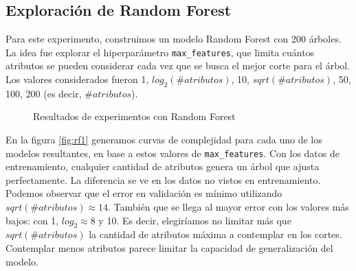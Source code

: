 \subsection*{Exploración de Random Forest}
Para este experimento, construimos un modelo Random Forest con 200 árboles. La idea fue explorar el hiperparámetro \texttt{max\_features}, que limita cuántos atributos se pueden considerar cada vez que se busca el mejor corte para el árbol. Los valores considerados fueron  1, $log_2(\#atributos)$, 10, $sqrt(\#atributos)$, 50, 100, 200 (es decir, $\#atributos$).
 \begin{figure}[H]
    \centering

    \caption{Resultados de experimentos con Random Forest}
    \label{fig:distr}
\end{figure}

En la figura \ref{fig:rf1} generamos curvas de complejidad para cada uno de los modelos resultantes, en base a estos valores de \texttt{max\_features}. Con los datos de entrenamiento, cualquier cantidad de atributos genera un árbol que ajusta perfectamente. La diferencia se ve en los datos no vistos en entrenamiento. Podemos observar que el error en validación es mínimo utilizando $sqrt(\#atributos) \approx 14$. También que se llega al mayor error con los valores más bajos: con 1, $log_2 \approx 8$ y 10. Es decir, elegiríamos no limitar más que $sqrt(\#atributos)$ la cantidad de atributos máxima a contemplar en los cortes. Contemplar menos atributos parece limitar la capacidad de generalización del modelo.

